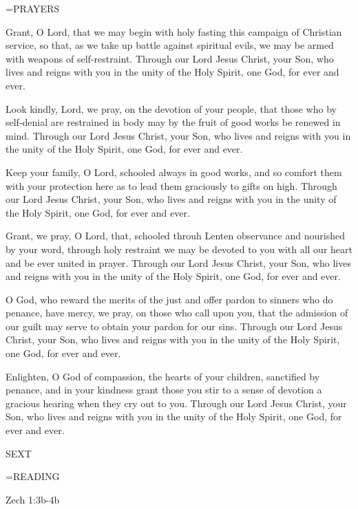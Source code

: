 \hangindent=\parindent \small PRAYERS
\begin{description}[labelindent=\parindent, noitemsep, leftmargin=*]
\item [Ash Wednesday:] 	Grant, O Lord, that we may begin with holy fasting this campaign of Christian service, so that, as we take up battle against spiritual evils, we may be armed with weapons of self-restraint. Through our Lord Jesus Christ, your Son, who lives and reigns with you in the unity of the Holy Spirit, one God, for ever and ever.
\item [Week 1:] 	Look kindly, Lord, we pray, on the devotion of your people, that those who by self-denial are restrained in body may by the fruit of good works be renewed in mind. Through our Lord Jesus Christ, your Son, who lives and reigns with you in the unity of the Holy Spirit, one God, for ever and ever.
\item [Week 2:] 	Keep your family, O Lord, schooled always in good works, and so comfort them with your protection here as to lead them graciously to gifts on high. Through our Lord Jesus Christ, your Son, who lives and reigns with you in the unity of the Holy Spirit, one God, for ever and ever.
\item [Week 3:] 	Grant, we pray, O Lord, that, schooled throuh Lenten observance and nourished by your word, through holy restraint we may be devoted to you with all our heart and be ever united in prayer. Through our Lord Jesus Christ, your Son, who lives and reigns with you in the unity of the Holy Spirit, one God, for ever and ever.
\item [Week 4:] 	O God, who reward the merits of the just and offer pardon to sinners who do penance, have mercy, we pray, on those who call upon you, that the admission of our guilt may serve to obtain your pardon for our sins. Through our Lord Jesus Christ, your Son, who lives and reigns with you in the unity of the Holy Spirit, one God, for ever and ever.
\item [Week 5:] 	Enlighten, O God of compassion, the hearts of your children, sanctified by penance, and in your kindness grant those you stir to a sense of devotion a gracious hearing when they cry out to you. Through our Lord Jesus Christ, your Son, who lives and reigns with you in the unity of the Holy Spirit, one God, for ever and ever.
\end{description}

\begin{flushleft}\normalsize SEXT\\\end{flushleft}
\hangindent=\parindent \small READING
\begin{description}[labelindent=\parindent, leftmargin=*]
\item [Ash Wednesday \& Weeks 1-4:]     Zech 1:3b-4b \textbf{    }
\end{description}


